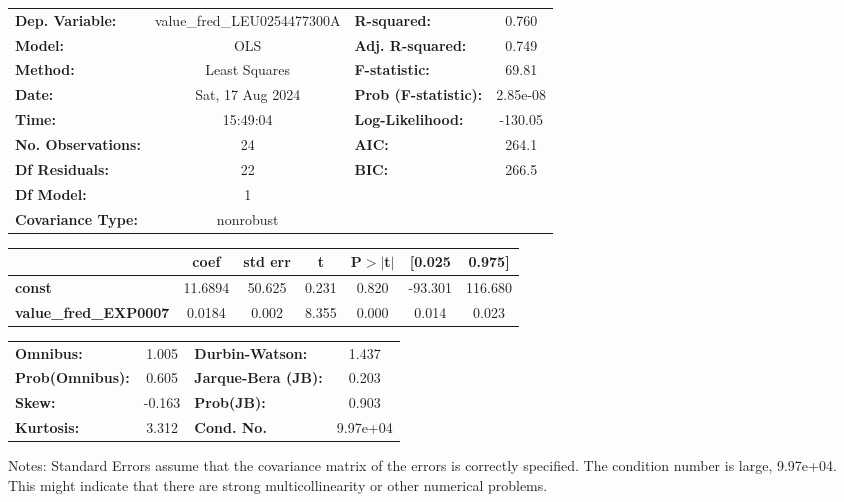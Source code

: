 \begin{center}
\begin{tabular}{lclc}
\toprule
\textbf{Dep. Variable:}       & value\_fred\_LEU0254477300A & \textbf{  R-squared:         } &     0.760   \\
\textbf{Model:}               &             OLS             & \textbf{  Adj. R-squared:    } &     0.749   \\
\textbf{Method:}              &        Least Squares        & \textbf{  F-statistic:       } &     69.81   \\
\textbf{Date:}                &       Sat, 17 Aug 2024      & \textbf{  Prob (F-statistic):} &  2.85e-08   \\
\textbf{Time:}                &           15:49:04          & \textbf{  Log-Likelihood:    } &   -130.05   \\
\textbf{No. Observations:}    &                24           & \textbf{  AIC:               } &     264.1   \\
\textbf{Df Residuals:}        &                22           & \textbf{  BIC:               } &     266.5   \\
\textbf{Df Model:}            &                 1           & \textbf{                     } &             \\
\textbf{Covariance Type:}     &          nonrobust          & \textbf{                     } &             \\
\bottomrule
\end{tabular}
\begin{tabular}{lcccccc}
                              & \textbf{coef} & \textbf{std err} & \textbf{t} & \textbf{P$> |$t$|$} & \textbf{[0.025} & \textbf{0.975]}  \\
\midrule
\textbf{const}                &      11.6894  &       50.625     &     0.231  &         0.820        &      -93.301    &      116.680     \\
\textbf{value\_fred\_EXP0007} &       0.0184  &        0.002     &     8.355  &         0.000        &        0.014    &        0.023     \\
\bottomrule
\end{tabular}
\begin{tabular}{lclc}
\textbf{Omnibus:}       &  1.005 & \textbf{  Durbin-Watson:     } &    1.437  \\
\textbf{Prob(Omnibus):} &  0.605 & \textbf{  Jarque-Bera (JB):  } &    0.203  \\
\textbf{Skew:}          & -0.163 & \textbf{  Prob(JB):          } &    0.903  \\
\textbf{Kurtosis:}      &  3.312 & \textbf{  Cond. No.          } & 9.97e+04  \\
\bottomrule
\end{tabular}
\end{center}

Notes: \newline
 [1] Standard Errors assume that the covariance matrix of the errors is correctly specified. \newline
 [2] The condition number is large, 9.97e+04. This might indicate that there are \newline
 strong multicollinearity or other numerical problems.